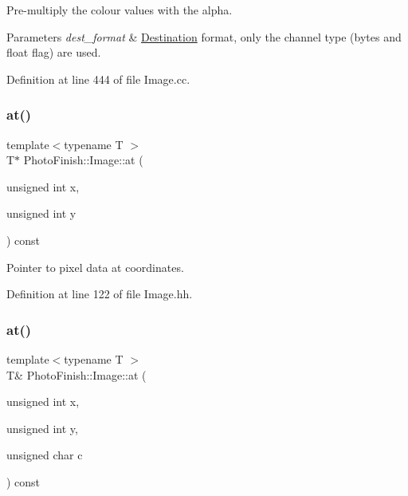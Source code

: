 Pre-\/multiply the colour values with the alpha. 


\begin{DoxyParams}{Parameters}
{\em dest\+\_\+format} & \hyperlink{class_photo_finish_1_1_destination}{Destination} format, only the channel type (bytes and float flag) are used. \\
\hline
\end{DoxyParams}


Definition at line 444 of file Image.\+cc.

\mbox{\label{class_photo_finish_1_1_image_a3c37b36b0de68de2d1f3dac005c9bc44}} 
\subsubsection{\texorpdfstring{at()}{at()}\hspace{0.1cm}{\footnotesize\ttfamily [1/2]}}
{\footnotesize\ttfamily template$<$typename T $>$ \\
T$\ast$ Photo\+Finish\+::\+Image\+::at (\begin{DoxyParamCaption}\item[{unsigned int}]{x,  }\item[{unsigned int}]{y }\end{DoxyParamCaption}) const\hspace{0.3cm}{\ttfamily [inline]}}



Pointer to pixel data at coordinates. 



Definition at line 122 of file Image.\+hh.

\mbox{\label{class_photo_finish_1_1_image_a5317fe76e44a998b01160ebfe1fa6f05}} 
\subsubsection{\texorpdfstring{at()}{at()}\hspace{0.1cm}{\footnotesize\ttfamily [2/2]}}
{\footnotesize\ttfamily template$<$typename T $>$ \\
T\& Photo\+Finish\+::\+Image\+::at (\begin{DoxyParamCaption}\item[{unsigned int}]{x,  }\item[{unsigned int}]{y,  }\item[{unsigned char}]{c }\end{DoxyParamCaption}) const\hspace{0.3cm}{\ttfamily [inline]}}



